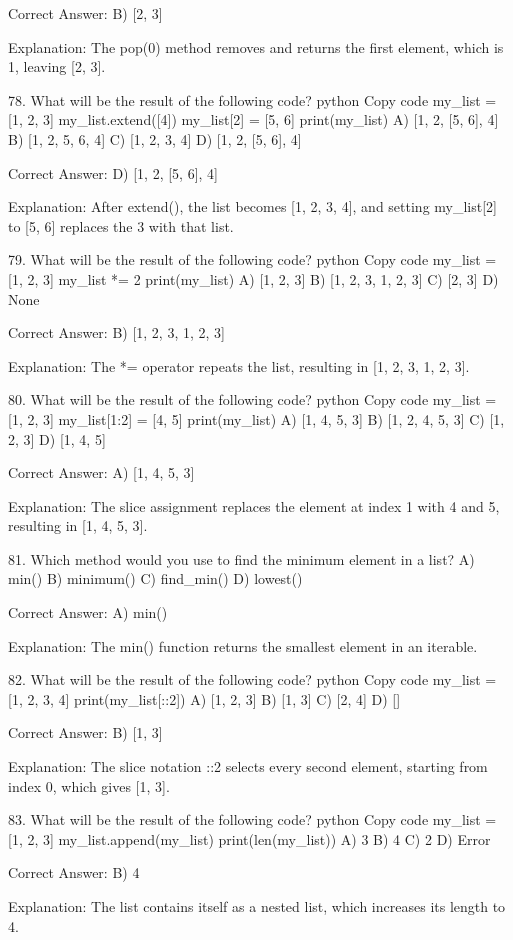 Correct Answer: B) [2, 3]

Explanation:
The pop(0) method removes and returns the first element, which is 1, leaving [2, 3].

78. What will be the result of the following code?
python
Copy code
my_list = [1, 2, 3]
my_list.extend([4])
my_list[2] = [5, 6]
print(my_list)
A) [1, 2, [5, 6], 4]
B) [1, 2, 5, 6, 4]
C) [1, 2, 3, 4]
D) [1, 2, [5, 6], 4]

Correct Answer: D) [1, 2, [5, 6], 4]

Explanation:
After extend(), the list becomes [1, 2, 3, 4], and setting my_list[2] to [5, 6] replaces the 3 with that list.

79. What will be the result of the following code?
python
Copy code
my_list = [1, 2, 3]
my_list *= 2
print(my_list)
A) [1, 2, 3]
B) [1, 2, 3, 1, 2, 3]
C) [2, 3]
D) None

Correct Answer: B) [1, 2, 3, 1, 2, 3]

Explanation:
The *= operator repeats the list, resulting in [1, 2, 3, 1, 2, 3].

80. What will be the result of the following code?
python
Copy code
my_list = [1, 2, 3]
my_list[1:2] = [4, 5]
print(my_list)
A) [1, 4, 5, 3]
B) [1, 2, 4, 5, 3]
C) [1, 2, 3]
D) [1, 4, 5]

Correct Answer: A) [1, 4, 5, 3]

Explanation:
The slice assignment replaces the element at index 1 with 4 and 5, resulting in [1, 4, 5, 3].

81. Which method would you use to find the minimum element in a list?
A) min()
B) minimum()
C) find_min()
D) lowest()

Correct Answer: A) min()

Explanation:
The min() function returns the smallest element in an iterable.

82. What will be the result of the following code?
python
Copy code
my_list = [1, 2, 3, 4]
print(my_list[::2])
A) [1, 2, 3]
B) [1, 3]
C) [2, 4]
D) []

Correct Answer: B) [1, 3]

Explanation:
The slice notation ::2 selects every second element, starting from index 0, which gives [1, 3].

83. What will be the result of the following code?
python
Copy code
my_list = [1, 2, 3]
my_list.append(my_list)
print(len(my_list))
A) 3
B) 4
C) 2
D) Error

Correct Answer: B) 4

Explanation:
The list contains itself as a nested list, which increases its length to 4.

